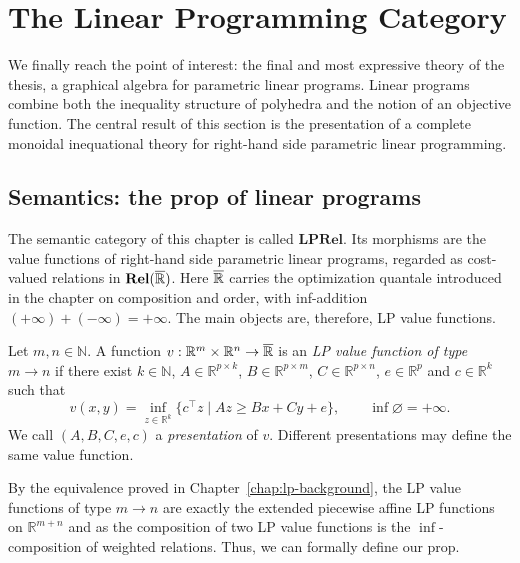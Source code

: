 \chapter{The Linear Programming Category}\label{sec:glp}

We finally reach the point of interest: the
final and most expressive theory of the thesis,
a graphical algebra for parametric linear programs.
Linear programs combine both the inequality structure of polyhedra
and the notion of an objective function.
The central result of this section is the presentation of a
complete monoidal inequational theory for right-hand side parametric
linear programming.

\section{Semantics: the prop of linear programs}\label{sec:lprel}

The semantic category of this chapter is called $\mathbf{LPRel}$. Its
morphisms are the value functions of right-hand side parametric linear
programs, regarded as cost-valued relations in
$\mathbf{Rel}(\overline{\mathbb{R}})$. Here $\overline{\mathbb{R}}$ carries the optimization
quantale introduced in the chapter on composition and order, with
inf-addition $(+\infty)+(-\infty)=+\infty$. The main objects are, therefore,
LP value functions.

\begin{definition}\label{def:lp-value}
    Let $m,n\in\mathbb{N}$. A function
    $v:\mathbb{R}^m\times\mathbb{R}^n\to\overline{\mathbb{R}}$ is an
    \emph{LP value function of type $m\to n$} if there exist
    $k\in\mathbb{N}$, $A\in\mathbb{R}^{p\times k}$,
    $B\in\mathbb{R}^{p\times m}$, $C\in\mathbb{R}^{p\times n}$,
    $e\in\mathbb{R}^p$ and $c\in\mathbb{R}^k$ such that
    \[
        v(x,y)=\inf_{z\in\mathbb{R}^k}\{c^\top z \mid Az\ge Bx+Cy+e\},
        \qquad \inf\varnothing=+\infty .
    \]
    We call $(A,B,C,e,c)$ a \emph{presentation} of $v$. Different
    presentations may define the same value function.
\end{definition}

By the equivalence proved in Chapter~\ref{chap:lp-background}, the LP
value functions of type $m\to n$ are exactly the extended piecewise
affine LP functions on $\mathbb{R}^{m+n}$ and as
the composition of two LP value functions is the $\inf$-composition
of weighted relations. Thus, we can formally define our prop.

